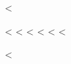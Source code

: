 \documentclass[paper=a4,fontsize=10pt]{scrartcl}
\begin{document}


<%
  \makeatletter
  \begin{lrbox}\shippingAddressBox
    \parbox{\useplength{toaddrwidth}}{
      \par\smallskip
      \setlength{\parskip}{\z@}
      \par
      \normalsize
      <%
      <%
      <%
      <%
      <%
      <%
    }
  \end{lrbox}
  \makeatother
<%
\end{document}
